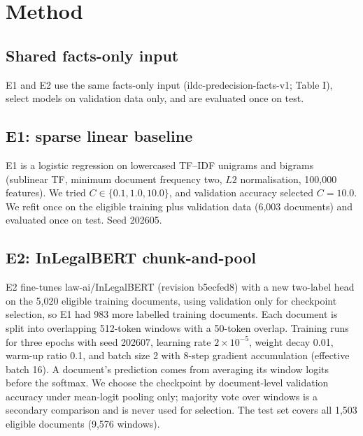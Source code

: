 \documentclass[conference]{IEEEtran}
\begin{document}
\section{Method}
\subsection{Shared facts-only input}
E1 and E2 use the same facts-only input (ildc-predecision-facts-v1; Table I), select models on validation data only, and are evaluated once on test.

\subsection{E1: sparse linear baseline}
E1 is a logistic regression on lowercased TF--IDF unigrams and bigrams (sublinear TF, minimum document frequency two, $L2$ normalisation, 100,000 features). We tried $C \in \{0.1, 1.0, 10.0\}$, and validation accuracy selected $C = 10.0$. We refit once on the eligible training plus validation data (6,003 documents) and evaluated once on test. Seed 202605.

\subsection{E2: InLegalBERT chunk-and-pool}
E2 fine-tunes law-ai/InLegalBERT (revision b5ecfed8) with a new two-label head on the 5,020 eligible training documents, using validation only for checkpoint selection, so E1 had 983 more labelled training documents. Each document is split into overlapping 512-token windows with a 50-token overlap. Training runs for three epochs with seed 202607, learning rate $2 \times 10^{-5}$, weight decay 0.01, warm-up ratio 0.1, and batch size 2 with 8-step gradient accumulation (effective batch 16). A document's prediction comes from averaging its window logits before the softmax. We choose the checkpoint by document-level validation accuracy under mean-logit pooling only; majority vote over windows is a secondary comparison and is never used for selection. The test set covers all 1,503 eligible documents (9,576 windows).
\end{document}
